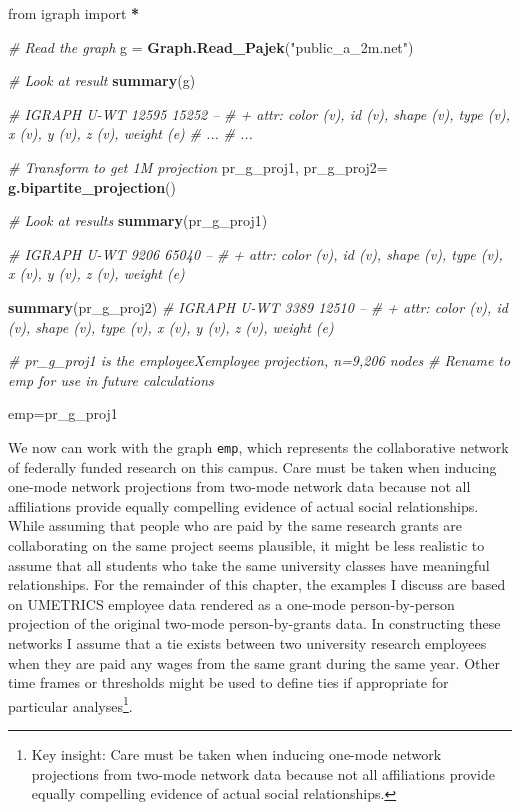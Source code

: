 \documentclass[]{krantz}
\newenvironment{Shaded}{\begin{snugshade}}{\end{snugshade}}
\newcommand{\KeywordTok}[1]{\textcolor[rgb]{0.13,0.29,0.53}{\textbf{#1}}}
\newcommand{\StringTok}[1]{\textcolor[rgb]{0.31,0.60,0.02}{#1}}
\newcommand{\CommentTok}[1]{\textcolor[rgb]{0.56,0.35,0.01}{\textit{#1}}}
\newcommand{\OperatorTok}[1]{\textcolor[rgb]{0.81,0.36,0.00}{\textbf{#1}}}
\newcommand{\NormalTok}[1]{#1}
\begin{document}
\begin{Shaded}
\begin{Highlighting}[]
\NormalTok{from igraph import }\OperatorTok{*}

\CommentTok{# Read the graph}
\NormalTok{g =}\StringTok{ }\KeywordTok{Graph.Read_Pajek}\NormalTok{(}\StringTok{"public_a_2m.net"}\NormalTok{)}

\CommentTok{# Look at result}
\KeywordTok{summary}\NormalTok{(g)}


\CommentTok{# IGRAPH U-WT 12595 15252 --}
\CommentTok{# + attr: color (v), id (v), shape (v), type (v), x (v), y (v), z (v), weight (e)}
\CommentTok{# ...}
\CommentTok{# ...}

\CommentTok{# Transform to get 1M projection}
\NormalTok{pr_g_proj1, pr_g_proj2=}\StringTok{ }\KeywordTok{g.bipartite_projection}\NormalTok{()}

\CommentTok{# Look at results}
\KeywordTok{summary}\NormalTok{(pr_g_proj1)}

\CommentTok{# IGRAPH U-WT 9206 65040 --}
\CommentTok{# + attr: color (v), id (v), shape (v), type (v), x (v), y (v), z (v), weight (e)}

\KeywordTok{summary}\NormalTok{(pr_g_proj2)}
\CommentTok{# IGRAPH U-WT 3389 12510 --}
\CommentTok{# + attr: color (v), id (v), shape (v), type (v), x (v), y (v), z (v), weight (e)}

\CommentTok{# pr_g_proj1 is the employeeXemployee projection, n=9,206 nodes}
\CommentTok{# Rename to emp for use in future calculations}

\NormalTok{emp=pr_g_proj1}
\end{Highlighting}
\end{Shaded}

We now can work with the graph \texttt{emp}, which represents the
collaborative network of federally funded research on this campus. Care
must be taken when inducing one-mode network projections from two-mode
network data because not all affiliations provide equally compelling
evidence of actual social relationships. While assuming that people who
are paid by the same research grants are collaborating on the same
project seems plausible, it might be less realistic to assume that all
students who take the same university classes have meaningful
relationships. For the remainder of this chapter, the examples I discuss
are based on UMETRICS employee data rendered as a one-mode
person-by-person projection of the original two-mode person-by-grants
data. In constructing these networks I assume that a tie exists between
two university research employees when they are paid any wages from the
same grant during the same year. Other time frames or thresholds might
be used to define ties if appropriate for particular analyses\footnote{Key
  insight: Care must be taken when inducing one-mode network projections
  from two-mode network data because not all affiliations provide
  equally compelling evidence of actual social relationships.}.
\end{document}
